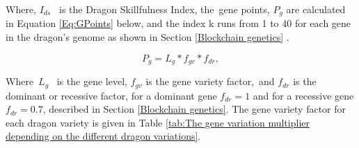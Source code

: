 \documentclass[12pt]{article}
\begin{document}
{\setlength{\parskip}{9.96pt}
Where,   $I_{ds}$ \  is the Dragon Skillfulness Index, the\ gene points,   $P_g$  are calculated in Equation   \ref{Eq:GPoints}   below, and the index k runs from 1 to 40 for each gene in the dragon’s genome as shown in Section  \ref{Blockchain genetics} . \par


\begin{center}
  \begin{equation} \label{Eq:GPoints}
     P_g=L_g*f_{gv}*f_{dr},
  \end{equation}
\end{center}
Where\   $L_g$ \ is the gene level,   $f_{gv}$  is the gene variety factor,\ and  $f_{dr}$   is the dominant or recessive factor, for a dominant gene   $f_{dr}=1$  and for a recessive gene   $f_{dr}=0.7$, described in  Section \ref{Blockchain genetics}. The gene variety factor for each dragon variety is given in  Table \ref{tab:The gene variation multiplier depending on the different dragon variations}.\par


\vspace{\baselineskip}




}
\end{document}
